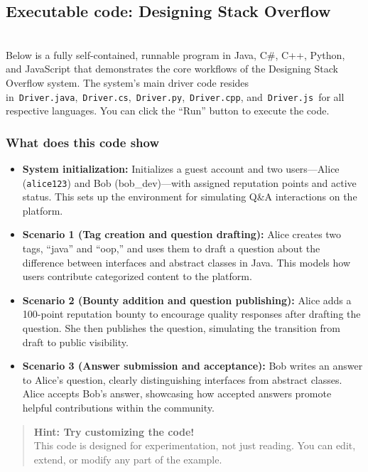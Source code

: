 \subsection{Executable code: Designing Stack Overflow}\label{mRiWAVwGAjXzjjLIri0XA}
\\
Below is a fully self-contained, runnable program in Java, C\#, C++, Python, and JavaScript that demonstrates the core workflows of the Designing Stack Overflow system. The system's main driver code resides in~\texttt{Driver.java},~\texttt{Driver.cs},~\texttt{Driver.py},~\texttt{Driver.cpp}, and~\texttt{Driver.js}~for all respective languages. You can click the ``Run'' button to execute the code.

\subsubsection{What does this code show}\label{4VuIFXTFaihKUO3kDpZoP}

\begin{itemize}
\item
\protect{}\label{lZSH5-mzHIs8g6dW6Lcxy}
\textbf{System initialization:} Initializes a guest account and two users---Alice (\texttt{alice123}) and Bob (bob\_dev)---with assigned reputation points and active status. This sets up the environment for simulating Q\&A interactions on the platform.
\item
\protect{}\label{Bj-rjzM7H9hSbNYXd1CAU}
\textbf{Scenario 1 (Tag creation and question drafting):} Alice creates two tags, ``java'' and ``oop,'' and uses them to draft a question about the difference between interfaces and abstract classes in Java. This models how users contribute categorized content to the platform.
\item
\protect{}\label{QDaOr_ClfBb-eqXXd2527}
\textbf{Scenario 2 (Bounty addition and question publishing):} Alice adds a 100-point reputation bounty to encourage quality responses after drafting the question. She then publishes the question, simulating the transition from draft to public visibility.
\item
\protect{}\label{O7o2T6NduMuHyEo1DAlqH}
\textbf{Scenario 3 (Answer submission and acceptance):} Bob writes an answer to Alice's question, clearly distinguishing interfaces from abstract classes. Alice accepts Bob's answer, showcasing how accepted answers promote helpful contributions within the community.
\end{itemize}
\begin{quote}
\textbf{Hint: Try customizing the code!}\\
This code is designed for experimentation, not just reading. You can edit, extend, or modify any part of the example.
\end{quote}

